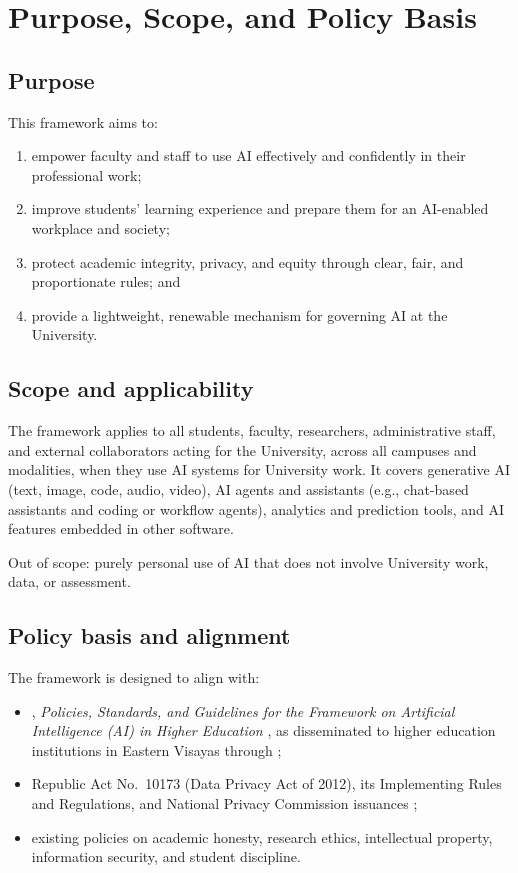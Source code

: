 \section{Purpose, Scope, and Policy Basis}

\subsection{Purpose}
This framework aims to:
\begin{enumerate}[label=(\alph*)]
  \item empower faculty and staff to use AI effectively and confidently in their professional work;
  \item improve students' learning experience and prepare them for an AI-enabled workplace and society;
  \item protect academic integrity, privacy, and equity through clear, fair, and proportionate rules; and
  \item provide a lightweight, renewable mechanism for governing AI at the University.
\end{enumerate}

\subsection{Scope and applicability}
The framework applies to all \vsu{} students, faculty, researchers, administrative staff, and external collaborators acting for the University, across all campuses and modalities, when they use AI systems for University work. It covers generative AI (text, image, code, audio, video), AI agents and assistants (e.g., chat-based assistants and coding or workflow agents), analytics and prediction tools, and AI features embedded in other software.

Out of scope: purely personal use of AI that does not involve University work, data, or assessment.

\subsection{Policy basis and alignment}
The framework is designed to align with:
\begin{itemize}
  \item \cmo{}, \emph{Policies, Standards, and Guidelines for the Framework on Artificial Intelligence (AI) in Higher Education} \citep{cmo21}, as disseminated to higher education institutions in Eastern Visayas through \rmo{} \citep{rmo318};
  \item Republic Act No.\ 10173 (Data Privacy Act of 2012), its Implementing Rules and Regulations, and National Privacy Commission issuances \citep{ra10173};
  \item existing \vsu{} policies on academic honesty, research ethics, intellectual property, information security, and student discipline.
\end{itemize}

